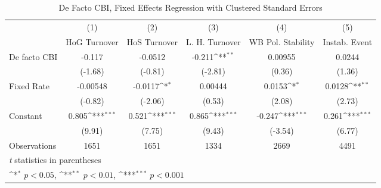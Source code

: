 \begin{table}[htbp]\centering
\def\sym#1{\ifmmode^{#1}\else\(^{#1}\)\fi}
\caption{De Facto CBI, Fixed Effects Regression with Clustered Standard Errors \label{multIndFEDF}}
\begin{tabular}{l*{5}{c}}
\toprule
                                        &\multicolumn{1}{c}{(1)}&\multicolumn{1}{c}{(2)}&\multicolumn{1}{c}{(3)}&\multicolumn{1}{c}{(4)}&\multicolumn{1}{c}{(5)}\\
                                        &\multicolumn{1}{c}{HoG Turnover}&\multicolumn{1}{c}{HoS Turnover}&\multicolumn{1}{c}{L. H. Turnover}&\multicolumn{1}{c}{WB Pol. Stability}&\multicolumn{1}{c}{Instab. Event}\\
\midrule
De facto CBI                            &   -0.117         &  -0.0512         &   -0.211\sym{**} &  0.00955         &   0.0244         \\
                                        &  (-1.68)         &  (-0.81)         &  (-2.81)         &   (0.36)         &   (1.36)         \\
\addlinespace
Fixed Rate                              & -0.00548         &  -0.0117\sym{*}  &  0.00444         &   0.0153\sym{*}  &   0.0128\sym{**} \\
                                        &  (-0.82)         &  (-2.06)         &   (0.53)         &   (2.08)         &   (2.73)         \\
\addlinespace
Constant                                &    0.805\sym{***}&    0.521\sym{***}&    0.865\sym{***}&   -0.247\sym{***}&    0.261\sym{***}\\
                                        &   (9.91)         &   (7.75)         &   (9.43)         &  (-3.54)         &   (6.77)         \\
\midrule
Observations                            &     1651         &     1651         &     1334         &     2669         &     4491         \\
\bottomrule
\multicolumn{6}{l}{\footnotesize \textit{t} statistics in parentheses}\\
\multicolumn{6}{l}{\footnotesize \sym{*} \(p<0.05\), \sym{**} \(p<0.01\), \sym{***} \(p<0.001\)}\\
\end{tabular}
\end{table}

